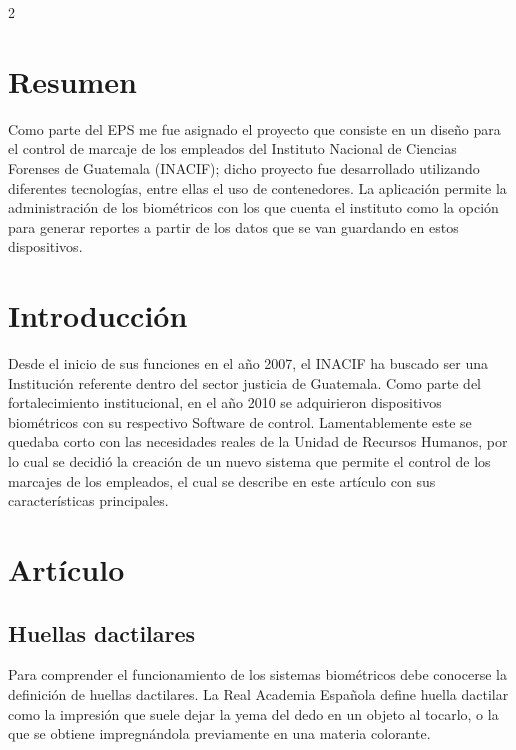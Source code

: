 \documentclass[12pt,spanish,Letterpaper,openany]{book}
\begin{document}
\begin {multicols}{2}

\hypertarget{resumen-4}{%
\section{Resumen}\label{resumen-4}}

Como parte del EPS me fue asignado el proyecto que consiste en un diseño para el control de marcaje de los empleados del Instituto Nacional de Ciencias Forenses de Guatemala (INACIF); dicho proyecto fue desarrollado utilizando diferentes tecnologías, entre ellas el uso de contenedores. La aplicación permite la administración de los biométricos con los que cuenta el instituto como la opción para generar reportes a partir de los datos que se van guardando en estos dispositivos.

\hypertarget{introducciuxf3n-6}{%
\section{Introducción}\label{introducciuxf3n-6}}

Desde el inicio de sus funciones en el año 2007, el INACIF ha buscado ser una Institución referente dentro del sector justicia de Guatemala. Como parte del fortalecimiento institucional, en el año 2010 se adquirieron dispositivos biométricos con su respectivo Software de control. Lamentablemente este se quedaba corto con las necesidades reales de la Unidad de Recursos Humanos, por lo cual se
decidió la creación de un nuevo sistema que permite el control de los marcajes de los empleados, el cual se describe en este artículo con sus características principales.

\hypertarget{artuxedculo-5}{%
\section{Artículo}\label{artuxedculo-5}}

\hypertarget{huellas-dactilares}{%
\subsection{Huellas dactilares}\label{huellas-dactilares}}

Para comprender el funcionamiento de los sistemas biométricos debe conocerse la definición de huellas dactilares. La Real Academia Española define huella dactilar como la impresión que suele dejar la yema del dedo en un objeto al tocarlo, o la que se obtiene impregnándola previamente en una materia colorante.


\end{multicols}
\end{document}
